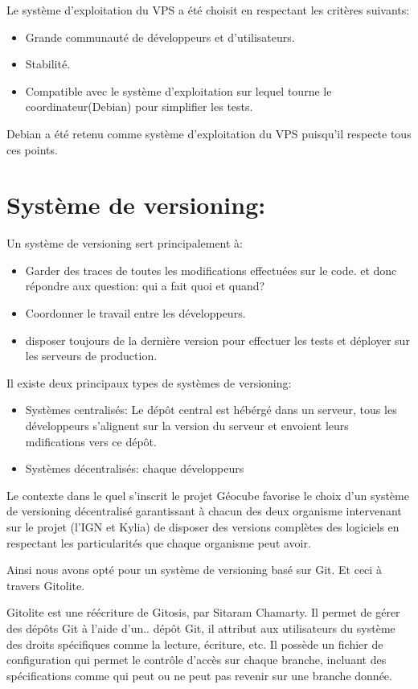 \documentclass{themeensg}
\begin{document}
Le système d'exploitation du VPS a été choisit en respectant les critères suivants:
\begin{itemize}
\item Grande communauté de développeurs et d'utilisateurs.
\item Stabilité.
\item Compatible avec le système d'exploitation sur lequel tourne le coordinateur(Debian) pour simplifier les tests.
\end{itemize}

Debian a été retenu comme système d'exploitation du VPS puisqu'il respecte tous ces points.

\section{Système de versioning:}
Un système de versioning sert principalement à:

\begin{itemize}
\item Garder des traces de toutes les modifications effectuées sur le code. et donc répondre aux question: qui a fait quoi et quand?
\item Coordonner le travail entre les développeurs.
\item disposer toujours de la dernière version pour effectuer les tests et déployer sur les serveurs de production.
\end{itemize}

Il existe deux principaux types de systèmes de versioning:
\begin{itemize}
\item Systèmes centralisés: Le dépôt central est hébérgé dans un serveur, tous les développeurs s'alignent sur la version du serveur et envoient leurs mdifications vers ce dépôt.
\item Systèmes décentralisés: chaque développeurs
\end{itemize}

Le contexte dans le quel s'inscrit le projet Géocube favorise le choix d'un système de versioning décentralisé garantissant à chacun des deux organisme intervenant sur le projet (l'IGN et Kylia) de disposer des versions complètes des logiciels en respectant les particularités que chaque organisme peut avoir.

Ainsi nous avons opté pour un système de versioning basé sur Git. Et ceci à travers Gitolite.

Gitolite est une réécriture de Gitosis, par Sitaram Chamarty. Il permet de gérer des dépôts Git à l'aide d'un.. dépôt Git, il attribut aux utilisateurs du système des droits spécifiques comme la lecture, écriture, etc. Il possède un fichier de configuration qui permet le contrôle d'accès sur chaque branche, incluant des spécifications comme qui peut ou ne peut pas revenir sur une branche donnée.
\end{document}
